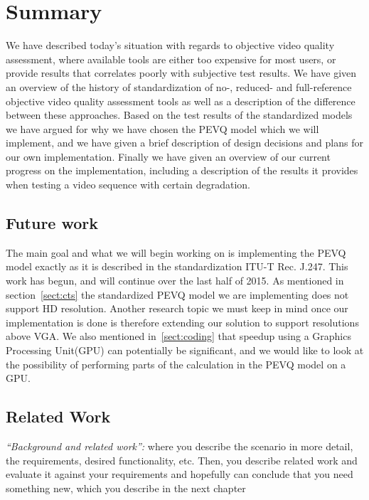 \section{Summary}\label{sect:summary}
We have described today's situation with regards to objective video quality assessment, where available tools are either too expensive for most users, or provide results that correlates poorly with subjective test results. We have given an overview of the history of standardization of no-, reduced- and full-reference objective video quality assessment tools as well as a description of the difference between these approaches. Based on the test results of the standardized models we have argued for why we have chosen the PEVQ model which we will implement, and we have given a brief description of design decisions and plans for our own implementation. Finally we have given an overview of our current progress on the implementation, including a description of the results it provides when testing a video sequence with certain degradation.

\subsection{Future work}\label{sect:future work}
The main goal and what we will begin working on is implementing the PEVQ model exactly as it is described in the standardization ITU-T Rec. J.247. This work has begun, and will continue over the last half of 2015. As mentioned in section~\ref{sect:cts} the standardized PEVQ model we are implementing does not support HD resolution. Another research topic we must keep in mind once our implementation is done is therefore extending our solution to support resolutions above VGA. We also mentioned in~\ref{sect:coding} that speedup using a Graphics Processing Unit(GPU) can potentially be significant, and we would like to look at the possibility of performing parts of the calculation in the PEVQ model on a GPU.

\subsection{Related Work}\label{sect:related work}

\textit{``Background and related work'':} where you describe the
  scenario in more detail, the requirements, desired functionality,
  etc. Then, you describe related work and evaluate it against your
  requirements and hopefully can conclude that you need something new,
  which you describe in the next chapter

